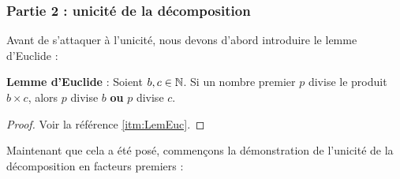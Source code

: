 \subsubsection{Partie 2 : unicité de la décomposition}

Avant de s'attaquer à l'unicité, nous devons d'abord introduire le lemme d'Euclide :

\begin{lemma}
\textbf{Lemme d'Euclide} : \newline
Soient $b,c \in \mathbb{N}$. \newline
Si un nombre premier $p$ divise le produit $b \times c$, alors $p$ divise $b$ \textbf{ou} $p$ divise $c$.
\end{lemma}

\begin{proof}
Voir la référence \ref{itm:LemEuc}.
\end{proof}

Maintenant que cela a été posé, commençons la démonstration de l'unicité de la décomposition en facteurs premiers :

